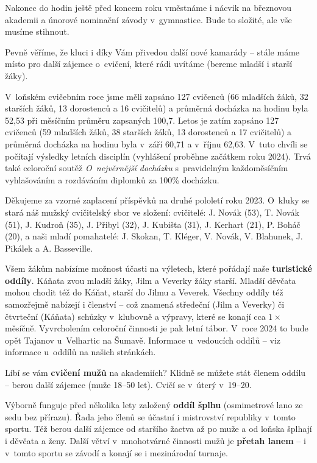 \documentclass[11pt]{article}
\begin{document}
Nakonec do hodin ještě před koncem roku vměstnáme i nácvik na březnovou akademii a únorové nominační závody v~gymnastice. Bude to složité, ale vše musíme stihnout.

Pevně věříme, že kluci i díky Vám přivedou další nové kamarády – stále máme místo pro další zájemce o~cvičení, které rádi uvítáme (bereme mladší i starší žáky).

V~loňském cvičebním roce jsme měli zapsáno 127 cvičenců (66 mladších žáků, 32 starších žáků, 13 dorostenců a 16 cvičitelů) a průměrná docházka na hodinu byla 52,53 při měsíčním průměru zapsaných 100,7. Letos je zatím zapsáno 127 cvičenců (59 mladších žáků, 38 starších žáků, 13 dorostenců a 17 cvičitelů) a průměrná docházka na hodinu byla v~září 60,71 a v~říjnu 62,63.
V~tuto chvíli se počítají výsledky letních disciplín (vyhlášení proběhne začátkem roku 2024). Trvá také celoroční soutěž \textit{O~nejvěrnější docházku} s~pravidelným každoměsíčním vyhlašováním a rozdáváním diplomků za 100\% docházku.

Děkujeme za vzorné zaplacení příspěvků na druhé pololetí roku 2023.
O~kluky se stará náš mužský cvičitelský sbor ve složení: cvičitelé: J. Novák (53), T. Novák (51), J. Kudroň (35), J. Přibyl (32), J. Kubišta (31), J. Kerhart (21), P. Boháč (20), a naši mladí pomahatelé: J. Skokan, T. Kléger, V. Novák, V. Blahunek, J. Pikálek a A. Basseville. 

Všem žákům nabízíme možnost účasti na výletech, které pořádají naše \textbf{turistické oddíly}. Káňata zvou mladší žáky, Jilm a Veverky žáky starší. Mladší děvčata mohou chodit též do Káňat, starší do Jilmu a Veverek. Všechny oddíly též samozřejmě nabízejí i členství – což znamená středeční (Jilm a Veverky) či čtvrteční (Káňata) schůzky v~klubovně a výpravy, které se konají cca \(1\times\) měsíčně. Vyvrcholením celoroční činnosti je pak letní tábor. V~roce 2024 to bude opět Tajanov u~Velhartic na Šumavě. Informace u~vedoucích oddílů – viz informace u~oddílů na našich stránkách. 

Líbí se vám \textbf{cvičení mužů} na akademiích? Klidně se můžete stát členem oddílu – berou další zájemce (muže 18–50 let). Cvičí se v~úterý v~19–20. 

Výborně funguje před několika lety založený \textbf{oddíl šplhu} (osmimetrové lano ze sedu bez přírazu). Řada jeho členů se účastní i mistrovství republiky v~tomto sportu. Též berou další zájemce od staršího žactva až po muže a od loňska šplhají i děvčata a ženy. Další větví v~mnohotvárné činnosti mužů je \textbf{přetah lanem} – i v~tomto sportu se závodí a konají se i mezinárodní turnaje.
\end{document}
